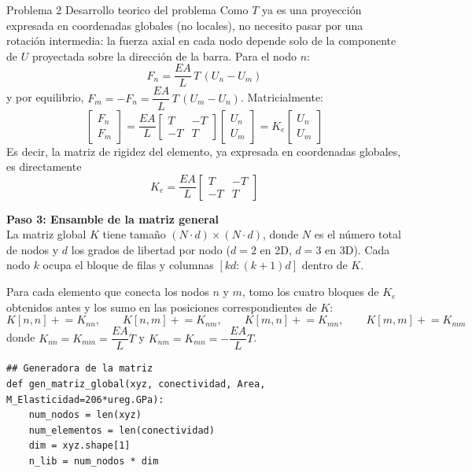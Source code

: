\begin{desarrollo}{Problema 2 Desarrollo teorico del problema}
Como $T$ ya es una proyección expresada en coordenadas globales (no locales), no necesito pasar por una rotación intermedia: la fuerza axial en cada nodo depende solo de la componente de $U$ proyectada sobre la dirección de la barra. Para el nodo $n$:
$$F_n = \frac{EA}{L}\,T\,(U_n - U_m)$$
y por equilibrio, $F_m = -F_n = \dfrac{EA}{L}\,T\,(U_m - U_n)$. Matricialmente:
$$\begin{bmatrix} F_n\\ F_m \end{bmatrix} = \frac{EA}{L}\begin{bmatrix} T & -T\\ -T & T \end{bmatrix}\begin{bmatrix} U_n\\ U_m \end{bmatrix} = K_e \begin{bmatrix} U_n\\ U_m \end{bmatrix}$$
Es decir, la matriz de rigidez del elemento, ya expresada en coordenadas globales, es directamente
$$K_e = \frac{EA}{L}\begin{bmatrix} T & -T\\ -T & T \end{bmatrix}$$

\textbf{Paso 3: Ensamble de la matriz general}\\
La matriz global $K$ tiene tamaño $(N\cdot d)\times(N\cdot d)$, donde $N$ es el número total de nodos y $d$ los grados de libertad por nodo ($d=2$ en 2D, $d=3$ en 3D). Cada nodo $k$ ocupa el bloque de filas y columnas $[kd:(k+1)d]$ dentro de $K$.

Para cada elemento que conecta los nodos $n$ y $m$, tomo los cuatro bloques de $K_e$ obtenidos antes y los sumo en las posiciones correspondientes de $K$:
$$K[n,n] \mathrel{+}= K_{nn}, \qquad K[n,m] \mathrel{+}= K_{nm}, \qquad K[m,n] \mathrel{+}= K_{mn}, \qquad K[m,m] \mathrel{+}= K_{mm}$$
donde $K_{nn}=K_{mm}=\dfrac{EA}{L}T$ y $K_{nm}=K_{mn}=-\dfrac{EA}{L}T$.\\

\begin{lstlisting}[style=pythonstyle, caption={Ensamblaje de la matriz de rigidez global}, label={lst:gen_matriz_global}]
## Generadora de la matriz
def gen_matriz_global(xyz, conectividad, Area, M_Elasticidad=206*ureg.GPa):
    num_nodos = len(xyz)
    num_elementos = len(conectividad)
    dim = xyz.shape[1]          
    n_lib = num_nodos * dim     


\end{lstlisting}
\end{desarrollo}
